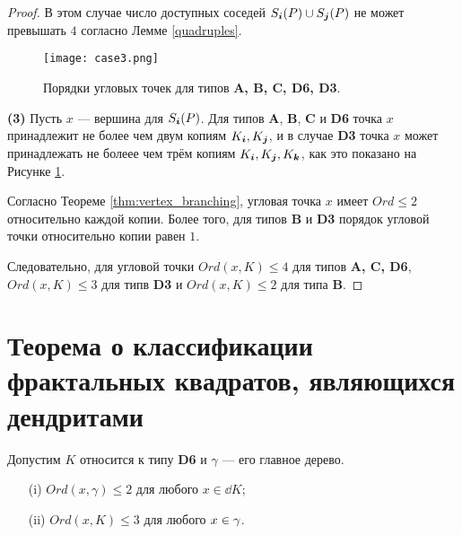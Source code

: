 \begin{proof}
В этом случае число доступных соседей $S_{\bm{i}}(P)\cup S_{\bm{j}}(P)$ не может превышать $4$ согласно Лемме \ref{quadruples}.

\begin{figure}[H]
    \centering
%
    \texttt{[image: case3.png]}
    \caption{Порядки угловых точек для типов {\bf A, B, C, D6, D3}.}
    \label{fig:case3}
\end{figure}

\textbf{(3)}
Пусть $x$ --- вершина для $S_{\bm{i}}(P)$.
Для типов \textbf{A},  \textbf{B}, \textbf{C} и \textbf{D6} точка $x$ принадлежит не более чем двум копиям $K_{\bm{i}}, K_{\bm{j}}$, и в случае \textbf{D3} точка $x$ может принадлежать не болеее чем трём копиям $K_{\bm{i}}, K_{\bm{j}}, K_{\bm{k}}$, как это показано на Рисунке \ref{fig:case3}.

Согласно Теореме \ref{thm:vertex_branching}, угловая точка $x$ имеет $Ord\leq2$ относительно каждой копии.
Более того, для типов \textbf{B} и \textbf{D3} порядок угловой точки относительно копии равен $1$.

Следовательно, для угловой точки $Ord(x,K)\leq4$ для типов {\bf A, C, D6}, $Ord(x,K)\leq3$ для типв {\bf D3} и 
$Ord(x,K)\leq2$ для типа {\bf B}.
\end{proof}



\section{Теорема о классификации фрактальных квадратов, являющихся дендритами}

\begin{proposition}\label{lem:d4bound}
Допустим $K$ относится к типу {\bf D6} и $\gamma$ --- его главное дерево.
\begin{itemize}[nolistsep]
    \item[(i)] $Ord(x,\gamma)\leq2$ для любого $x\in\dd K$;
    \item[(ii)] $Ord(x,K)\leq3$ для любого $x\in\gamma$.
\end{itemize}
  

\end{proposition}

